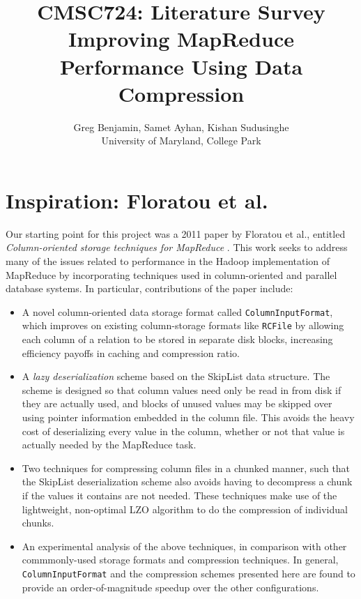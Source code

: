 \documentclass[twocolumn]{article}
\title{CMSC724: Literature Survey \\
Improving MapReduce Performance Using Data Compression}
\author{Greg Benjamin, Samet Ayhan, Kishan Sudusinghe \\
University of Maryland, College Park}
\date{}
\begin{document}
\maketitle

\section{Inspiration: Floratou et al.}

Our starting point for this project was a 2011 paper by Floratou et al., entitled
\emph{Column-oriented storage techniques for MapReduce} \cite{ref:floratou}.  This work
seeks to address many of the issues related to performance in the Hadoop implementation
of MapReduce by incorporating techniques used in column-oriented and parallel database
systems.  In particular, contributions of the paper include:

\begin{itemize}
\item A novel column-oriented data storage format called \verb+ColumnInputFormat+,
which improves on existing column-storage formats like \verb+RCFile+ \cite{ref:rcfile}
by allowing each column of a relation to be stored in separate disk blocks, increasing
efficiency payoffs in caching and compression ratio.
\item A \emph{lazy deserialization} scheme based on the SkipList \cite{ref:skiplist}
data structure.  The scheme is designed so that column values need only be read
in from disk if they are actually used, and blocks of unused values may be skipped
over using pointer information embedded in the column file.  This avoids the
heavy cost of deserializing every value in the column, whether or not that value
is actually needed by the MapReduce task.
\item Two techniques for compressing column files in a chunked manner, such that
the SkipList deserialization scheme also avoids having to decompress a chunk if
the values it contains are not needed.  These techniques make use of the lightweight,
non-optimal LZO algorithm \cite{ref:lzo} to do the compression of
individual chunks.
\item An experimental analysis of the above techniques, in comparison with other
commmonly-used storage formats and compression techniques.  In general, 
\verb+ColumnInputFormat+ and the compression schemes presented here are
found to provide an order-of-magnitude speedup over the other configurations.
\end{itemize}
\end{document}
